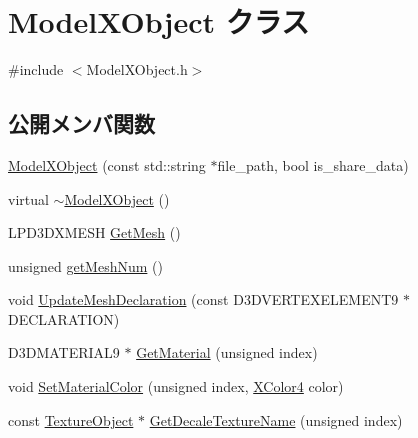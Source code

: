 \hypertarget{class_model_x_object}{}\section{Model\+X\+Object クラス}
\label{class_model_x_object}


{\ttfamily \#include $<$Model\+X\+Object.\+h$>$}

\subsection*{公開メンバ関数}
\begin{DoxyCompactItemize}
\item 
\mbox{\hyperlink{class_model_x_object_a83bd334b1f24a69c4cbdcaa62464ff31}{Model\+X\+Object}} (const std\+::string $\ast$file\+\_\+path, bool is\+\_\+share\+\_\+data)
\item 
virtual \mbox{\hyperlink{class_model_x_object_a33553f8ab78dfd3c9d571a048ae85324}{$\sim$\+Model\+X\+Object}} ()
\item 
L\+P\+D3\+D\+X\+M\+E\+SH \mbox{\hyperlink{class_model_x_object_a3aaab083fe6e1956b2eaab815ebb4bfb}{Get\+Mesh}} ()
\item 
unsigned \mbox{\hyperlink{class_model_x_object_a894790eda90cf0cc202b86f854583fda}{get\+Mesh\+Num}} ()
\item 
void \mbox{\hyperlink{class_model_x_object_ac005f3f164a1f75d6cfc0772e2e95382}{Update\+Mesh\+Declaration}} (const D3\+D\+V\+E\+R\+T\+E\+X\+E\+L\+E\+M\+E\+N\+T9 $\ast$D\+E\+C\+L\+A\+R\+A\+T\+I\+ON)
\item 
D3\+D\+M\+A\+T\+E\+R\+I\+A\+L9 $\ast$ \mbox{\hyperlink{class_model_x_object_a27df4304e87da11e2f9c9d7a8487a985}{Get\+Material}} (unsigned index)
\item 
void \mbox{\hyperlink{class_model_x_object_acc6b5f187b74b421451c8c2c7c2964d7}{Set\+Material\+Color}} (unsigned index, \mbox{\hyperlink{_vector3_d_8h_a680c30c4a07d86fe763c7e01169cd6cc}{X\+Color4}} color)
\item 
const \mbox{\hyperlink{class_texture_object}{Texture\+Object}} $\ast$ \mbox{\hyperlink{class_model_x_object_afd57d5b6b74817f4d69047640e69f14e}{Get\+Decale\+Texture\+Name}} (unsigned index)
\end{DoxyCompactItemize}
